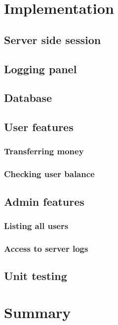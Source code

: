 \documentclass[a4paper,12pt]{book}
\begin{document}
\chapter{Implementation}
\section{Server side session}
\section{Logging panel}
\section{Database}
\section{User features}
\subsection{Transferring money}
\subsection{Checking user balance}
\section{Admin features}
\subsection{Listing all users}
\subsection{Access to server logs}
\section{Unit testing}
\chapter{Summary}
\end{document}
